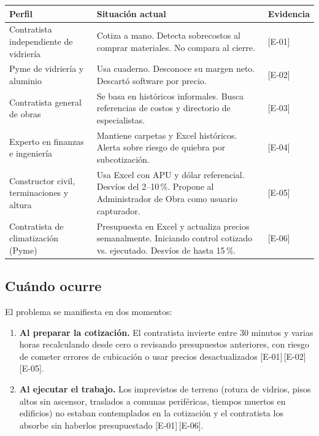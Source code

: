\documentclass[11pt]{article}
\newcommand{\ev}[1]{\textcolor{prblue}{[#1]}}
\begin{document}
\begin{tabularx}{\linewidth}{@{}lXl@{}}
\toprule
\textbf{Perfil} & \textbf{Situación actual} & \textbf{Evidencia} \\
\midrule
Contratista independiente de vidriería &
  Cotiza a mano. Detecta sobrecostos al comprar materiales. No compara al cierre. &
  \ev{E-01} \\
\addlinespace
Pyme de vidriería y aluminio &
  Usa cuaderno. Desconoce su margen neto. Descartó software por precio. &
  \ev{E-02} \\
\addlinespace
Contratista general de obras &
  Se basa en históricos informales. Busca referencias de costos y directorio de especialistas. &
  \ev{E-03} \\
\addlinespace
Experto en finanzas e ingeniería &
  Mantiene carpetas y Excel históricos. Alerta sobre riesgo de quiebra por subcotización. &
  \ev{E-04} \\
\addlinespace
Constructor civil, terminaciones y altura &
  Usa Excel con APU y dólar referencial. Desvíos del 2--10\,\%. Propone al Administrador de Obra como usuario capturador. &
  \ev{E-05} \\
\addlinespace
Contratista de climatización (Pyme) &
  Presupuesta en Excel y actualiza precios semanalmente. Iniciando control cotizado vs. ejecutado. Desvíos de hasta 15\,\%. &
  \ev{E-06} \\
\bottomrule
\end{tabularx}

\subsection{Cuándo ocurre}

El problema se manifiesta en dos momentos:
\begin{enumerate}
  \item \textbf{Al preparar la cotización.} El contratista invierte entre 30 minutos
  y varias horas recalculando desde cero o revisando presupuestos anteriores, con
  riesgo de cometer errores de cubicación o usar precios desactualizados
  \ev{E-01}\,\ev{E-02}\,\ev{E-05}.
  \item \textbf{Al ejecutar el trabajo.} Los imprevistos de terreno (rotura de
  vidrios, pisos altos sin ascensor, traslados a comunas periféricas, tiempos muertos
  en edificios) no estaban contemplados en la cotización y el contratista los absorbe
  sin haberlos presupuestado \ev{E-01}\,\ev{E-06}.
\end{enumerate}
\end{document}
